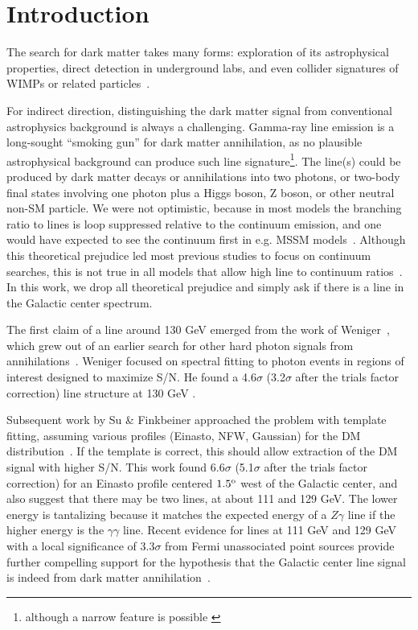 \documentclass[aps,twocolumn,prd,superscriptaddress,showpacs,nofootinbib,fixfloat]{revtex4}
\newcommand{\degree}{^{\rm o}}
\begin{document}
\section{Introduction}



The search for dark matter takes many forms: exploration of
its astrophysical properties, direct detection in
underground labs, and even collider signatures of WIMPs or
related
particles~\citep{Jungman:1995df,Bergstrom:2000,Bertone:2005,
Hooper:2007Review, 2012arXiv1205.4882B}.

For indirect direction, distinguishing the dark matter
signal from conventional astrophysics background is always a
challenging. Gamma-ray line emission is a long-sought
``smoking gun'' for dark matter annihilation, as no
plausible astrophysical background can produce such line
signature\footnote{although a narrow feature is possible
\citep[see][]{2012arXiv1207.0458A}}.  The line(s) could be
produced by dark matter decays or annihilations into two
photons, or two-body final states involving one photon plus
a Higgs boson, Z boson, or other neutral non-SM
particle. We were not optimistic, because in most models the
branching ratio to lines is loop suppressed relative to the
continuum emission, and one would have expected to see the
continuum first in e.g. MSSM
models~\citep[e.g.][]{Bergstrom:1997}.  Although this
theoretical prejudice led most previous studies to focus on
continuum searches, this is not true in all models that
allow high line to continuum
ratios~\citep[e.g.][]{Bergstrom:1998,Bergstrom:2000,Bertone:2009,Jackson:2010,Cline:2012,Weiner:2012}.
In this work, we drop all theoretical prejudice and simply
ask if there is a line in the Galactic center spectrum.

The first claim of a line around 130 GeV emerged from the
work of Weniger~\citep{Weniger:2012}, which grew out of an
earlier search for other hard photon signals from
annihilations~\citep{Bringmann:2012}.  Weniger focused on
spectral fitting to photon events in regions of interest
designed to maximize S/N.  He found a 4.6$\sigma$
(3.2$\sigma$ after the trials factor correction) line
structure at 130 GeV .

Subsequent work by Su \& Finkbeiner approached the problem
with template fitting, assuming various profiles (Einasto,
NFW, Gaussian) for the DM distribution~\citep{linepaper}.
If the template is correct, this should allow extraction of
the DM signal with higher S/N.  This work found 6.6$\sigma$
(5.1$\sigma$ after the trials factor correction) for an
Einasto profile centered $1.5\degree$ west of the Galactic
center, and also suggest that there may be two lines, at
about 111 and 129 GeV.  The lower energy is tantalizing
because it matches the expected energy of a $Z\gamma$ line
if the higher energy is the $\gamma\gamma$ line.  Recent
evidence for lines at 111 GeV and 129 GeV with a local
significance of $3.3\sigma$ from Fermi unassociated point
sources provide further compelling support for the
hypothesis that the Galactic center line signal is indeed
from dark matter annihilation~\cite{doubleline}.
\end{document}
